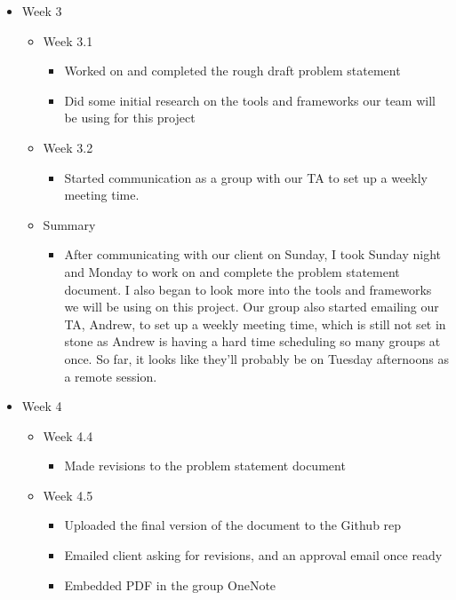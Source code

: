 \begin{itemize}
\item Week 3
	\begin{itemize}
	\item Week 3.1
      \begin{itemize}
      \item Worked on and completed the rough draft problem statement 
      \item Did some initial research on the tools and frameworks our team will be using for this project 
      \end{itemize}
	\item Week 3.2
      \begin{itemize}
      \item Started communication as a group with our TA to set up a weekly meeting time. 
      \end{itemize}
    
    \item Summary
      \begin{itemize}
      \item After communicating with our client on Sunday, I took Sunday night and Monday to work on and complete the problem statement document. I also began to look more into the tools and frameworks we will be using on this project. Our group also started emailing our TA, Andrew, to set up a weekly meeting time, which is still not set in stone as Andrew is having a hard time scheduling so many groups at once. So far, it looks like they'll probably be on Tuesday afternoons as a remote session. 
      \end{itemize}
	\end{itemize}

\item Week 4
	\begin{itemize}
	\item Week 4.4
      \begin{itemize}
      \item Made revisions to the problem statement document 
      \end{itemize}
	\item Week 4.5
      \begin{itemize}
      \item Uploaded the final version of the document to the Github rep
      \item Emailed client asking for revisions, and an approval email once ready 
      \item Embedded PDF in the group OneNote 
      \end{itemize}
    

\end{itemize}
\end{itemize}
